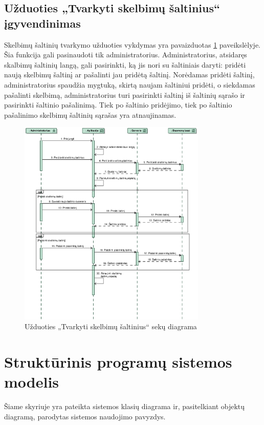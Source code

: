 \documentclass[12pt]{article}
\begin{document}
	\subsection{Užduoties „Tvarkyti skelbimų šaltinius“ įgyvendinimas}
	Skelbimų šaltinių tvarkymo užduoties vykdymas yra pavaizduotas \ref{ManSouSeq} paveikslėlyje. Šia funkcija gali pasinaudoti tik administratorius. Administratorius, atsidaręs skalbimų šaltinių langą, gali pasirinkti, ką jis nori su šaltiniais daryti: pridėti naują skelbimų šaltinį ar pašalinti jau pridėtą šaltinį. Norėdamas pridėti šaltinį, administratorius spaudžia mygtuką, skirtą naujam šaltiniui pridėti, o siekdamas pašalinti skelbimą, administratorius turi pasirinkti šaltinį iš šaltinių sąrašo ir pasirinkti šaltinio pašalinimą. Tiek po šaltinio pridėjimo, tiek po šaltinio pašalinimo skelbimų šaltinių sąrašas yra atnaujinamas.
	\begin{figure}[h]
		\begin{center}
			\includegraphics[width=0.8\textwidth]{TvarkytiSkelbimuSaltinius.eps}
			\caption{Užduoties „Tvarkyti skelbimų šaltinius“ sekų diagrama\label{ManSouSeq}}
		\end{center}
	\end{figure}

	\pagebreak
	
	\section{Struktūrinis programų sistemos modelis}
	Šiame skyriuje yra pateikta sistemos klasių diagrama ir, pasitelkiant objektų diagramą, parodytas sistemos naudojimo pavyzdys.
\end{document}
